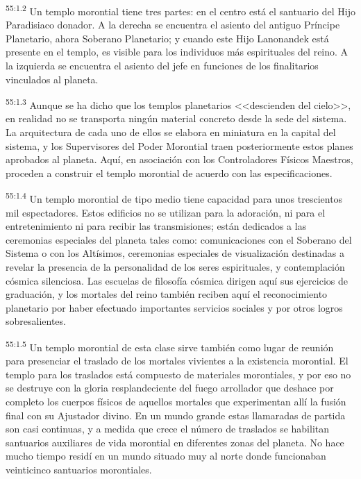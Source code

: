 \par
\textsuperscript{55:1.2} Un templo morontial tiene tres partes: en el centro está el santuario del Hijo Paradisiaco donador. A la derecha se encuentra el asiento del antiguo Príncipe Planetario, ahora Soberano Planetario; y cuando este Hijo Lanonandek está presente en el templo, es visible para los individuos más espirituales del reino. A la izquierda se encuentra el asiento del jefe en funciones de los finalitarios vinculados al planeta.

\par
\textsuperscript{55:1.3} Aunque se ha dicho que los templos planetarios <<descienden del cielo>>, en realidad no se transporta ningún material concreto desde la sede del sistema. La arquitectura de cada uno de ellos se elabora en miniatura en la capital del sistema, y los Supervisores del Poder Morontial traen posteriormente estos planes aprobados al planeta. Aquí, en asociación con los Controladores Físicos Maestros, proceden a construir el templo morontial de acuerdo con las especificaciones.

\par
\textsuperscript{55:1.4} Un templo morontial de tipo medio tiene capacidad para unos trescientos mil espectadores. Estos edificios no se utilizan para la adoración, ni para el entretenimiento ni para recibir las transmisiones; están dedicados a las ceremonias especiales del planeta tales como: comunicaciones con el Soberano del Sistema o con los Altísimos, ceremonias especiales de visualización destinadas a revelar la presencia de la personalidad de los seres espirituales, y contemplación cósmica silenciosa. Las escuelas de filosofía cósmica dirigen aquí sus ejercicios de graduación, y los mortales del reino también reciben aquí el reconocimiento planetario por haber efectuado importantes servicios sociales y por otros logros sobresalientes.

\par
\textsuperscript{55:1.5} Un templo morontial de esta clase sirve también como lugar de reunión para presenciar el traslado de los mortales vivientes a la existencia morontial. El templo para los traslados está compuesto de materiales morontiales, y por eso no se destruye con la gloria resplandeciente del fuego arrollador que deshace por completo los cuerpos físicos de aquellos mortales que experimentan allí la fusión final con su Ajustador divino. En un mundo grande estas llamaradas de partida son casi continuas, y a medida que crece el número de traslados se habilitan santuarios auxiliares de vida morontial en diferentes zonas del planeta. No hace mucho tiempo residí en un mundo situado muy al norte donde funcionaban veinticinco santuarios morontiales.

